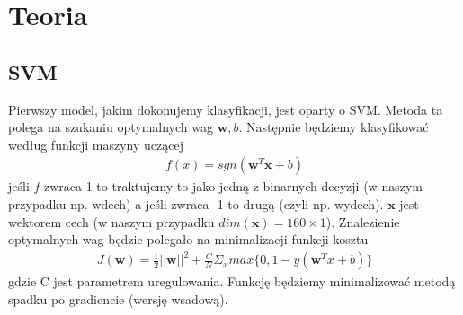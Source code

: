 \documentclass{article}
\begin{document}
\section{Teoria}
\subsection{SVM}
Pierwszy model, jakim dokonujemy klasyfikacji, jest oparty o SVM. Metoda ta polega na szukaniu optymalnych wag $\boldsymbol{w}, b$.
Następnie będziemy klasyfikować według funkcji maszyny uczącej 
\begin{gather*}
	f(x) = sgn(\boldsymbol{w}^T \boldsymbol{x} + b)
\end{gather*}
jeśli $f$ zwraca 1 to traktujemy to jako jedną z binarnych decyzji (w naszym przypadku np. wdech) a jeśli zwraca -1 to drugą (czyli np. wydech).
$\textbf{x}$ jest wektorem cech (w naszym przypadku $dim(\textbf{x}) = 160 \times 1$).  Znalezienie optymalnych wag będzie polegało na minimalizacji
funkcji kosztu
\begin{gather*}
	J(\boldsymbol{w}) = \frac{1}{2}||\boldsymbol{w}||^2 + \frac{C}{N}\Sigma_x max\{0, 1 - y(\boldsymbol{w}^Tx + b)\}
\end{gather*}
gdzie C jest parametrem uregulowania. Funkcję będziemy minimalizować metodą spadku po gradiencie (wersję wsadową).
\end{document}
